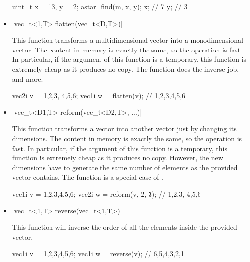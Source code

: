 \documentclass[12pt]{report}
\newenvironment{example}
{
    \begin{mdframed}[style=example,frametitle={Example}]
}
{
    \end{mdframed}
}
\begin{document}
\begin{itemize}
\begin{example}
\begin{cppcode}
uint_t x = 13, y = 2;
astar_find(m, x, y);
x; // 7
y; // 3
\end{cppcode}
\end{example}

\item \cppinline|vec_t<1,T> flatten(vec_t<D,T>)| 

This function transforms a multidimensional vector into a monodimensional vector. The content in memory is exactly the same, so the operation is fast. In particular, if the argument of this function is a temporary, this function is extremely cheap as it produces no copy. The  function does the inverse job, and more.

\begin{example}
\begin{cppcode}
vec2i v = {{1,2,3}, {4,5,6}};
vec1i w = flatten(v); // {1,2,3,4,5,6}
\end{cppcode}
\end{example}

\item \cppinline|vec_t<D1,T> reform(vec_t<D2,T>, ...)| 

This function transforms a vector into another vector just by changing its dimensions. The content in memory is exactly the same, so the operation is fast. In particular, if the argument of this function is a temporary, this function is extremely cheap as it produces no copy. However, the new dimensions have to generate the same number of elements as the provided vector contains. The  function is a special case of .

\begin{example}
\begin{cppcode}
vec1i v = {1,2,3,4,5,6};
vec2i w = reform(v, 2, 3); // {{1,2,3}, {4,5,6}}
\end{cppcode}
\end{example}

\item \cppinline|vec_t<1,T> reverse(vec_t<1,T>)| 

This function will inverse the order of all the elements inside the provided vector.

\begin{example}
\begin{cppcode}
vec1i v = {1,2,3,4,5,6};
vec1i w = reverse(v); // {6,5,4,3,2,1}
\end{cppcode}
\end{example}


\end{itemize}
\end{document}
